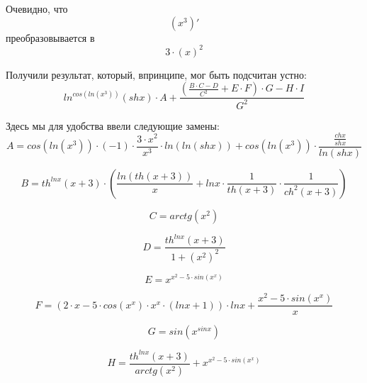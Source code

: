 \documentclass[a4paper, 12pt]{article}
\begin{document}
Очевидно, что
\begin{equation}
\left(x^{3} \right)'
\end{equation}
преобразовывается в
\begin{equation}
3\cdot \left(x \right)^2
\end{equation}

Получили результат, который, впринципе, мог быть подсчитан устно:
\begin{equation}
\boxed{ln^{cos\left(ln\left(x^{3}\right)\right)}\left(shx\right) \cdot A + \frac{\left(\frac{B \cdot C - D}{C^{2}} + E \cdot F\right) \cdot G - H \cdot I}{G^{2}}}
\end{equation}

Здесь мы для удобства ввели следующие замены:
\begin{equation}
	A = cos\left(ln\left(x^{3}\right)\right) \cdot \left(-1\right) \cdot \frac{3 \cdot x^{2}}{x^{3}} \cdot ln\left(ln\left(shx\right)\right) + cos\left(ln\left(x^{3}\right)\right) \cdot \frac{\frac{chx}{shx}}{ln\left(shx\right)}
\end{equation}

\begin{equation}
	B = th^{lnx}\left(x + 3\right) \cdot \left(\frac{ln\left(th\left(x + 3\right)\right)}{x} + lnx \cdot \frac{1}{th\left(x + 3\right)} \cdot \frac{1}{ch^{2}\left(x + 3\right)}\right)
\end{equation}

\begin{equation}
	C = arctg\left(x^{2}\right)
\end{equation}

\begin{equation}
	D = \frac{th^{lnx}\left(x + 3\right)}{1 + \left(x^{2}\right)^{2}}
\end{equation}

\begin{equation}
	E = x^{x^{2} - 5 \cdot sin\left(x^{x}\right)}
\end{equation}

\begin{equation}
	F = \left(2 \cdot x - 5 \cdot cos\left(x^{x}\right) \cdot x^{x} \cdot \left(lnx + 1\right)\right) \cdot lnx + \frac{x^{2} - 5 \cdot sin\left(x^{x}\right)}{x}
\end{equation}

\begin{equation}
	G = sin\left(x^{sinx}\right)
\end{equation}

\begin{equation}
	H = \frac{th^{lnx}\left(x + 3\right)}{arctg\left(x^{2}\right)} + x^{x^{2} - 5 \cdot sin\left(x^{x}\right)}
\end{equation}
\end{document}
